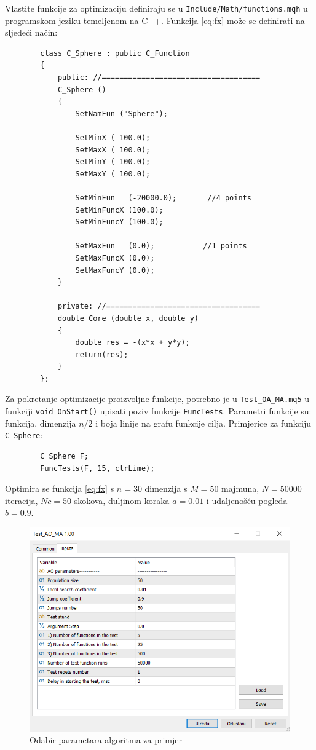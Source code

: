 Vlastite funkcije za optimizaciju definiraju se u \verb|Include/Math/functions.mqh| u programskom jeziku temeljenom na C++. Funkcija \eqref{eq:fx} može se definirati na sljedeći način:

\begin{framed}
	\begin{verbatim}
		class C_Sphere : public C_Function
		{
			public: //====================================
			C_Sphere ()
			{
				SetNamFun ("Sphere");
				
				SetMinX (-100.0);
				SetMaxX ( 100.0);
				SetMinY (-100.0);
				SetMaxY ( 100.0);
				
				SetMinFun   (-20000.0);       //4 points
				SetMinFuncX (100.0);
				SetMinFuncY (100.0);
				
				SetMaxFun   (0.0);           //1 points
				SetMaxFuncX (0.0);
				SetMaxFuncY (0.0);
			}
			
			private: //===================================
			double Core (double x, double y)
			{
				double res = -(x*x + y*y);
				return(res);
			}
		};
	\end{verbatim}
\end{framed}

Za pokretanje optimizacije proizvoljne funkcije, potrebno je u \verb|Test_OA_MA.mq5| u funkciji \verb|void OnStart()| upisati poziv funkcije \verb|FuncTests|. Parametri funkcije su: funkcija, dimenzija $n/2$ i boja linije na grafu funkcije cilja. Primjerice za funkciju \verb|C_Sphere|:

\begin{framed}
	\begin{verbatim}
		C_Sphere F;
		FuncTests(F, 15, clrLime);
	\end{verbatim}
\end{framed}


Optimira se funkcija \eqref{eq:fx} s  $n = 30$ dimenzija s $M = 50$ majmuna, $N = 50000$ iteracija, $Nc = 50$ skokova, duljinom koraka $a = 0.01$ i udaljenošću pogleda $b = 0.9$.


\begin{figure}[H]
	\centering
	\includegraphics[width=14cm]{mt53}
	\caption{Odabir parametara algoritma za primjer}
	\centering
\end{figure}

